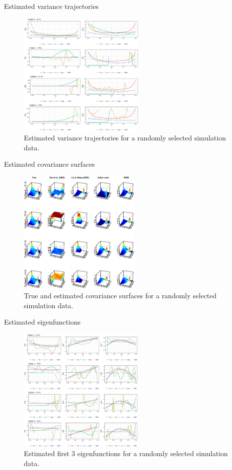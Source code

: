 \documentclass[9pt]{beamer}
\begin{document}
\begin{frame}[allowframebreaks]{Estimated variance trajectories}
	\begin{figure}[h]
		\centering
		\includegraphics[height=6cm,keepaspectratio=true]{img/var_traj.eps}
		\caption{Estimated variance trajectories for a randomly selected simulation data.}
		\label{fig5}
	\end{figure}
\end{frame}


\begin{frame}[allowframebreaks]{Estimated covariance surfaces}
	\begin{figure}[h]
		\centering
		\includegraphics[height=6cm,keepaspectratio=true]{img/cov_surf.eps}
		\caption{True and estimated covariance surfaces for a randomly selected simulation data.}
		\label{fig6}
	\end{figure}
\end{frame}

\begin{frame}[allowframebreaks]{Estimated eigenfunctions}
	\begin{figure}[h]
		\centering
		\includegraphics[height=6cm,keepaspectratio=true]{img/eig_traj.eps}
		\caption{Estimated first 3 eigenfunctions for a randomly selected simulation data.}
		\label{fig7}
	\end{figure}
\end{frame}
\end{document}
